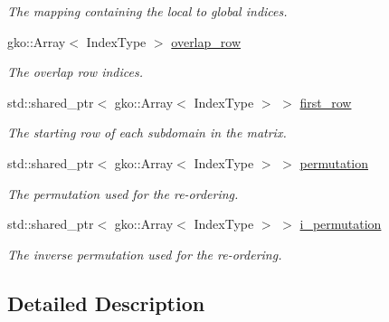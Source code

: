 \begin{DoxyCompactItemize}
\begin{DoxyCompactList}\small\item\em The mapping containing the local to global indices. \end{DoxyCompactList}\item 
\mbox{\label{structschwz_1_1Metadata_a91354b989537f17aeeac8dd2e0b872fe}} 
gko\+::\+Array$<$ Index\+Type $>$ \hyperlink{structschwz_1_1Metadata_a91354b989537f17aeeac8dd2e0b872fe}{overlap\+\_\+row}
\begin{DoxyCompactList}\small\item\em The overlap row indices. \end{DoxyCompactList}\item 
\mbox{\label{structschwz_1_1Metadata_a7720eefa9814e5a4db0d8705a1cf756f}} 
std\+::shared\+\_\+ptr$<$ gko\+::\+Array$<$ Index\+Type $>$ $>$ \hyperlink{structschwz_1_1Metadata_a7720eefa9814e5a4db0d8705a1cf756f}{first\+\_\+row}
\begin{DoxyCompactList}\small\item\em The starting row of each subdomain in the matrix. \end{DoxyCompactList}\item 
\mbox{\label{structschwz_1_1Metadata_af7361fcd600b3051619ce6e40770febc}} 
std\+::shared\+\_\+ptr$<$ gko\+::\+Array$<$ Index\+Type $>$ $>$ \hyperlink{structschwz_1_1Metadata_af7361fcd600b3051619ce6e40770febc}{permutation}
\begin{DoxyCompactList}\small\item\em The permutation used for the re-\/ordering. \end{DoxyCompactList}\item 
\mbox{\label{structschwz_1_1Metadata_a9ede19ac4f54b4161bed0a39bf7f5767}} 
std\+::shared\+\_\+ptr$<$ gko\+::\+Array$<$ Index\+Type $>$ $>$ \hyperlink{structschwz_1_1Metadata_a9ede19ac4f54b4161bed0a39bf7f5767}{i\+\_\+permutation}
\begin{DoxyCompactList}\small\item\em The inverse permutation used for the re-\/ordering. \end{DoxyCompactList}\end{DoxyCompactItemize}


\subsection{Detailed Description}
